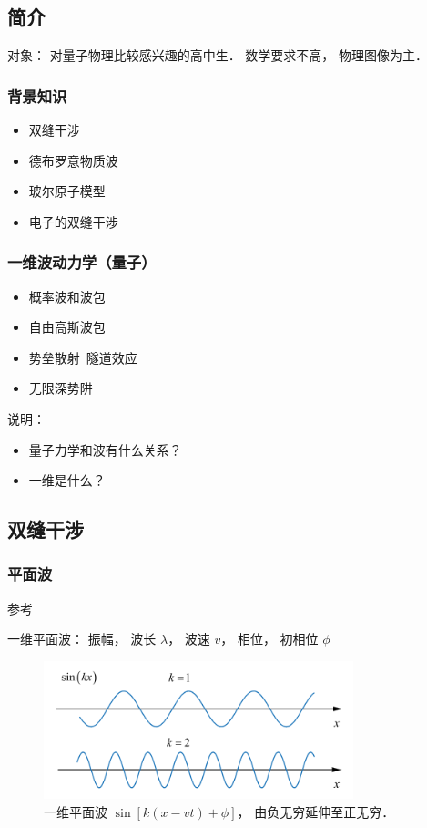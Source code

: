 
\subsection{简介}
对象： 对量子物理比较感兴趣的高中生． 数学要求不高， 物理图像为主．

\subsubsection{背景知识}
\begin{itemize}
\item 双缝干涉
\item 德布罗意物质波
\item 玻尔原子模型
\item 电子的双缝干涉
\end{itemize}

\subsubsection{一维波动力学（量子）}
\begin{itemize}
\item 概率波和波包
\item 自由高斯波包
\item 势垒散射\ 隧道效应
\item 无限深势阱
\end{itemize}

说明：
\begin{itemize}
\item 量子力学和波有什么关系？
\item 一维是什么？
\end{itemize}

\subsection{双缝干涉}

\subsubsection{平面波}

参考

一维平面波： 振幅， 波长 $\lambda$， 波速 $v$， 相位， 初相位 $\phi$
\begin{figure}[ht]
\centering
\includegraphics[width=9cm]{./figures/QMIntr2.png}
\caption{一维平面波 $\sin[k(x-vt) + \phi]$， 由负无穷延伸至正无穷．} \label{QMIntr_fig2}
\end{figure}

